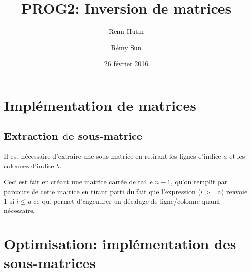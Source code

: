 \documentclass[a4paper,10pt]{article}
\title{PROG2: Inversion de matrices}
\author{Rémi Hutin \and Rémy Sun}
\date{26 février 2016}
\begin{document}
\maketitle

\begin{abstract}

\end{abstract}

\section{Implémentation de matrices}


\subsection{Extraction de sous-matrice}

Il est nécessaire d'extraire une sous-matrice en retirant les lignes d'indice $a$ et les colonnes d'indice $b$. 

Ceci est fait en créant une matrice carrée de taille $n-1$, qu'on remplit par parcours de cette matrice en tirant parti du fait que l'expression
($i$ >= a) renvoie 1 si $i \leq a$ ce qui permet d'engendrer un décalage de ligne/colonne quand nécessaire.

\section{Optimisation: implémentation des sous-matrices}
\end{document}
